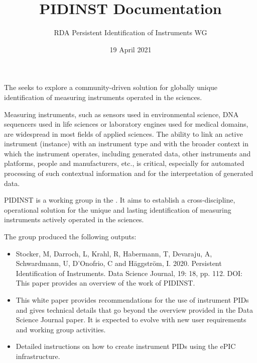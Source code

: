\documentclass[a4paper,10pt,english]{sphinxmanual}
\title{PIDINST Documentation}
\date{19 April 2021}
\author{RDA Persistent Identification of Instruments WG}
\let\sphinxpxdimen\pdfpxdimen\else\newdimen\sphinxpxdimen
\begin{document}
\pagestyle{empty}
\sphinxmaketitle
\pagestyle{plain}

\label{\detokenize{index::doc}}
\noindent{\hspace*{\fill}\sphinxincludegraphics[width=100\sphinxpxdimen]{{pidinst-logo}.pdf}}

The  seeks to explore a community-driven solution for globally
unique identification of measuring instruments operated in the
sciences.

Measuring instruments, such as sensors used in environmental science,
DNA sequencers used in life sciences or laboratory engines used for
medical domains, are widespread in most fields of applied sciences.
The ability to link an active instrument (instance) with an instrument
type and with the broader context in which the instrument operates,
including generated data, other instruments and platforms, people and
manufacturers, etc., is critical, especially for automated processing
of such contextual information and for the interpretation of generated
data.

PIDINST is a working group in the .  It aims to establish a cross-discipline, operational
solution for the unique and lasting identification of measuring
instruments actively operated in the sciences.

The group produced the following outputs:
\begin{itemize}
\item {} 
Stocker, M, Darroch, L, Krahl, R, Habermann, T, Devaraju, A,
Schwardmann, U, D’Onofrio, C and Häggström, I.  2020.  Persistent
Identification of Instruments.  Data Science Journal, 19: 18,
pp. 1\textendash{}12.  DOI:  
This paper provides an overview of the work of PIDINST.

\item {} 
{\hyperref[\detokenize{white-paper/index:white-paper}]{}} 
This white paper provides recommendations for the use of instrument
PIDs and gives technical details that go beyond the overview
provided in the Data Science Journal paper.  It is expected to
evolve with new user requirements and working group activities.

\item {} 
{\hyperref[\detokenize{cookbook/index:epic-cookbook}]{}} 
Detailed instructions on how to create instrument PIDs using the
ePIC infrastructure.

\end{itemize}
\end{document}
